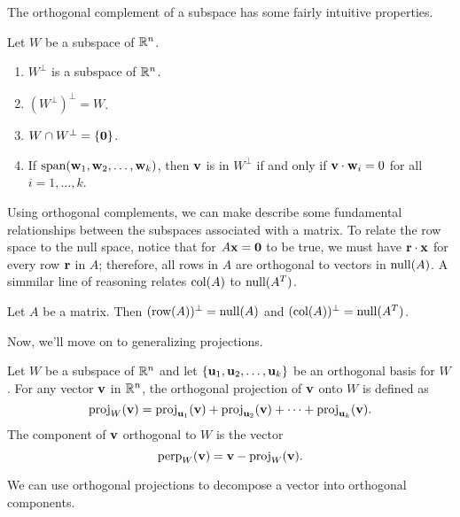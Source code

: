 \documentclass[../m73main.tex]{subfiles}
\begin{document}
The orthogonal complement of a subspace has some fairly intuitive properties.

\begin{theorem}
	Let $W$ be a subspace of $\mathbb{R}^n$.
	\begin{enumerate}[label=(\alph*)]
		\item $W^\perp$ is a subspace of $\mathbb{R}^n$.
		\item $\left( W^\perp \right)^\perp = W$.
		\item $W \cap W^\perp = \{\mathbf{0}\}$.
		\item If $\textrm{span}(\mathbf{w}_1, \mathbf{w}_2, \ldots, \mathbf{w}_k)$, then $\mathbf{v}$ is in $W^\perp$ if and only if $\mathbf{v} \cdot \mathbf{w}_i = 0$ for all $i = 1, \ldots, k$.
	\end{enumerate}
\end{theorem}

Using orthogonal complements, we can make describe some fundamental relationships between the subspaces associated with a matrix.
To relate the row space to the null space, notice that for $A \mathbf{x} = \mathbf{0}$ to be true, we must have $\mathbf{r} \cdot \mathbf{x}$ for every row $\mathbf{r}$ in $A$; therefore, all rows in $A$ are orthogonal to vectors in $\textrm{null}(A)$.
A simmilar line of reasoning relates $\textrm{col}(A)$ to $\textrm{null}(A^T)$. 

\begin{theorem}
	Let $A$ be a matrix.
	Then $(\textrm{row}(A))^\perp = \textrm{null}(A)$ and $(\textrm{col}(A))^\perp = \textrm{null}(A^T)$.
\end{theorem}

Now, we'll move on to generalizing projections.

\begin{definition}
	Let $W$ be a subspace of $\mathbb{R}^n$ and let $\{\mathbf{u}_1, \mathbf{u}_2, \ldots, \mathbf{u}_k\}$ be an orthogonal basis for $W$.
	For any vector $\mathbf{v}$ in $\mathbb{R}^n$, the orthogonal projection of $\mathbf{v}$ onto $W$ is defined as
	\[ \textrm{proj}_W(\mathbf{v}) = \textrm{proj}_{\mathbf{u}_1}(\mathbf{v}) + \textrm{proj}_{\mathbf{u}_2}(\mathbf{v}) + \cdots + \textrm{proj}_{\mathbf{u}_k}(\mathbf{v}). \]
	The component of $\mathbf{v}$ orthogonal to $W$ is the vector
	\[ \textrm{perp}_W(\mathbf{v}) = \mathbf{v} - \textrm{proj}_W(\mathbf{v}). \]
\end{definition}

We can use orthogonal projections to decompose a vector into orthogonal components.
\end{document}

